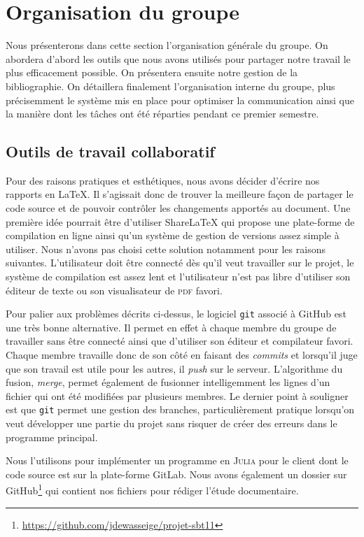 \section{Organisation du groupe}
Nous présenterons dans cette section l'organisation générale du groupe.
On abordera d'abord les outils que nous avons utilisés pour partager notre travail
le plus efficacement possible.
On présentera ensuite notre gestion de la bibliographie.
On détaillera finalement l'organisation interne du groupe,
plus précisemment le système mis en place pour optimiser la communication
ainsi que la manière dont les tâches ont été réparties pendant ce premier semestre.

\subsection{Outils de travail collaboratif}
Pour des raisons pratiques et esthétiques, nous avons décider d'écrire
nos rapports en \LaTeX.
Il s'agissait donc de trouver la meilleure façon de partager le code source
et de pouvoir contrôler les changements apportés au document.
Une première idée pourrait être d'utiliser ShareLaTeX qui propose une plate-forme
de compilation en ligne ainsi qu'un système de gestion de versions
assez simple à utiliser.
Nous n'avons pas choisi cette solution notamment pour les raisons suivantes.
L'utilisateur doit être connecté dès qu'il veut travailler sur le projet,
le système de compilation est assez lent et l'utilisateur n'est pas libre
d'utiliser son éditeur de texte ou son visualisateur de \textsc{pdf} favori.

Pour palier aux problèmes décrits ci-dessus, le logiciel \texttt{git}
associé à GitHub est une très bonne alternative.
Il permet en effet à chaque membre du groupe de travailler sans être connecté
ainsi que d'utiliser son éditeur et compilateur favori.
Chaque membre travaille donc de son côté en faisant des \emph{commits}
et lorsqu'il juge que son travail est utile pour les autres, 
il \emph{push} sur le serveur.
L'algorithme du fusion, \emph{merge}, permet également de fusionner intelligemment
les lignes d'un fichier qui ont été modifiées par plusieurs membres.
Le dernier point à souligner est que \texttt{git} permet une gestion des branches,
particulièrement pratique lorsqu'on veut développer une partie du projet
sans risquer de créer des erreurs dans le programme principal.

Nous l'utilisons pour implémenter un programme en \textsc{Julia}
pour le client dont le code source est sur la plate-forme GitLab.
Nous avons également un dossier sur
GitHub\footnote{\url{https://github.com/jdewasseige/projet-sbt11}}
qui contient nos fichiers pour rédiger l'étude documentaire.

